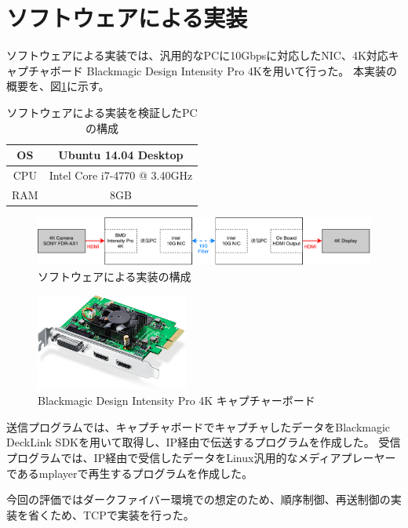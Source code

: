 \section{ソフトウェアによる実装}

ソフトウェアによる実装では、汎用的なPCに10Gbpsに対応したNIC、4K対応キャプチャボード Blackmagic Design Intensity Pro 4Kを用いて行った。
本実装の概要を、図\ref{fig:software-implement-flow}に示す。

\begin{table}[htbp]
  \caption{ソフトウェアによる実装を検証したPCの構成}
  \label{tb:software-specification}
  \begin{center}
  \begin{tabular}{c||c}
    \hline
    OS  & Ubuntu 14.04 Desktop \\\hline
    CPU & Intel Core i7-4770 @ 3.40GHz \\\hline
    RAM & 8GB                  \\\hline
  \end{tabular}\end{center}
\end{table}

\begin{figure}[htbp]
    \begin{center}
        \includegraphics[bb=0 0 841 121,width=15.5cm]{img/software-implement-flow.pdf}
    \end{center}
    \caption{ソフトウェアによる実装の構成}
    \label{fig:software-implement-flow}
\end{figure}

\begin{figure}[htbp]
    \begin{center}
        \includegraphics[bb=0 0 644 410,width=5cm]{img/bmd-intensity-pro-4k.jpg}
    \end{center}
    \caption{Blackmagic Design Intensity Pro 4K キャプチャーボード}
    \label{fig:ted-4k-fmc-card}
\end{figure}

送信プログラムでは、キャプチャボードでキャプチャしたデータをBlackmagic DeckLink SDK\cite{bmd-decklink-sdk}を用いて取得し、IP経由で伝送するプログラムを作成した。
受信プログラムでは、IP経由で受信したデータをLinux汎用的なメディアプレーヤーであるmplayerで再生するプログラムを作成した。

今回の評価ではダークファイバー環境での想定のため、順序制御、再送制御の実装を省くため、TCPで実装を行った。
